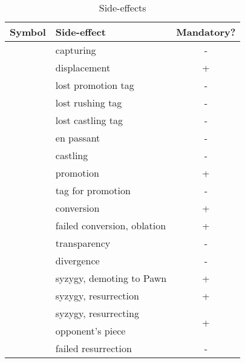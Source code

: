 \begin{table}[!h]
\centering
\begin{tabular}{ rlc }
\toprule %
\textbf{Symbol}             & \textbf{Side-effect}          & \textbf{Mandatory?}   \\
\midrule %
\alg{*}                     & capturing                     & -                     \\
\alg{<}                     & displacement                  & +                     \\
\cmidrule{1-3} %
\alg{==}                    & lost promotion tag            & -                     \\
\alg{::}                    & lost rushing tag              & -                     \\
\alg{\&\&}                  & lost castling tag             & -                     \\
\cmidrule{1-3} %
\alg{:}                     & en passant                    & -                     \\
\alg{\&}                    & castling                      & -                     \\
\alg{=}                     & promotion                     & +                     \\
\alg{=}                     & tag for promotion             & -                     \\
\alg{\%}                    & conversion                    & +                     \\
\alg{\%\%}                  & failed conversion, oblation   & +                     \\
\alg{\^{}}                  & transparency                  & -                     \\
\alg{/}                     & divergence                    & -                     \\
\alg{>}                     & syzygy, demoting to Pawn      & +                     \\
\alg{\$}                    & syzygy, resurrection          & +                     \\
\cmidrule{1-3} %
\multirow{2}{*}{\alg{\$\$}} & syzygy, resurrecting          & \multirow{2}{*}{+}    \\
                            & opponent's piece              &                       \\
\cmidrule{1-3} %
\alg{\$\$\$}                & failed resurrection           & -                     \\
\bottomrule %
\end{tabular}
\caption{Side-effects}
\label{tbl:Appendix/Summary/Side-effects}
\end{table}

